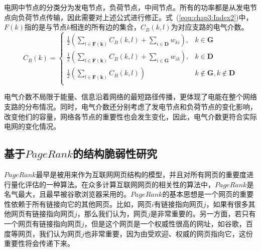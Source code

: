 电网中节点的分类分为发电节点，负荷节点，中间节点。所有的功率都是从发电节点向负荷节点传输，因此需要对上述公式进行修正。式~(\ref{equ:chap3:Index2})中，$F(k)$指的是与节点$k$相连的所有边的集合，$C_B(k,l)$为对应支路的电气介数。
\begin{equation}\label{equ:chap3:Index2}
C_B(k)= \begin{cases}
        \displaystyle\frac{1}{2}\left(\sum\limits_{l\in\mathbf{F(k)}}{C_B(k,l)}+\sum\limits_{i\in\mathbf{D}}{w_{ki}}\right), &  k\in\mathbf{G} \\
        \displaystyle\frac{1}{2}\left(\sum\limits_{l\in\mathbf{F(k)}}{C_B(k,l)}+\sum\limits_{i\in\mathbf{G}}{w_{ik}}\right), &  k\in\mathbf{D} \\
        \displaystyle\frac{1}{2}\left(\sum\limits_{l\in\mathbf{F(k)}}{C_B(k,l)}\right) & k\not\in\mathbf{G},k\not\in\mathbf{D} \\
      \end{cases}
\end{equation}

电气介数不局限于能量、信息沿着网络的最短路径传播，更体现了电能在整个网络支路的分布情况。同时，电气介数还分别考虑了发电节点和负荷节点的变化影响，改变他们的容量，网络各节点的重要性也会发生变化，因此，电气介数更符合实际电网的变化情况。

\subsection{基于$PageRank$的结构脆弱性研究}
\label{sec:pagerank}
$PageRank$最早是被用来作为互联网网页结构的模型，并且对所有网页的重要度进行量化评估的一种算法。在众多计算互联网网页的相关性的算法中，$PageRank$是名气最大，且最早被谷歌浏览器采用的。$PageRank$的基本思想是一个网页的重要性依赖于所有链接向它的其他网页。比如，网页$i$有链接指向网页$j$，如果有很多其他网页有链接指向网页$j$，那么我们认为，网页$j$是非常重要的。另一方面，若只有一个网页有链接指向网页$j$，但是这个网页是一个权威性很高的网址，如谷歌，百度等网页，我们认为网页$j$也非常重要，因为由受欢迎、权威的网页指向它，这份重要性将会传递下来。

